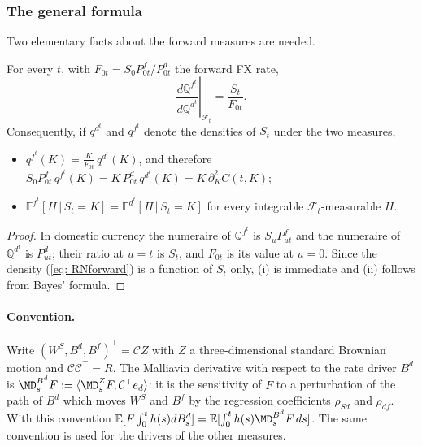 \subsubsection{The general formula}
Two elementary facts about the forward measures are needed.
\begin{lem}\label{lem: forwardMeasures}
For every $t$, with $F_{0t}=S_0P^f_{0t}/P^d_{0t}$ the forward FX rate,
\begin{equation}\label{eq: RNforward}
\left.\frac{d\mathbb{Q}^{f^t}}{d\mathbb{Q}^{d^t}}\right|_{\mathcal{F}_t}=\frac{S_t}{F_{0t}} .
\end{equation}
Consequently, if $q^{d^t}$ and $q^{f^t}$ denote the densities of $S_t$ under the two measures,
\begin{itemize}
\item[(i)] $q^{f^t}(K)=\frac{K}{F_{0t}}\,q^{d^t}(K)$, and therefore $S_0P^f_{0t}\,q^{f^t}(K)=K\,P^d_{0t}\,q^{d^t}(K)=K\,\partial_K^2C(t,K)$;
\item[(ii)] $\mathbb{E}^{f^t}[H\,|\,S_t=K]=\mathbb{E}^{d^t}[H\,|\,S_t=K]$ for every integrable $\mathcal{F}_t$-measurable $H$.
\end{itemize}
\end{lem}
\begin{proof}
In domestic currency the numeraire of $\mathbb{Q}^{f^t}$ is $S_uP^f_{ut}$ and the numeraire of $\mathbb{Q}^{d^t}$ is $P^d_{ut}$; their ratio at $u=t$ is $S_t$, and $F_{0t}$ is its value at $u=0$. Since the density (\ref{eq: RNforward}) is a function of $S_t$ only, (i) is immediate and (ii) follows from Bayes' formula.
\end{proof}

\paragraph{Convention.} Write $(W^S,B^d,B^f)^\top=\mathcal{C}Z$ with $Z$ a three-dimensional standard Brownian motion and $\mathcal{C}\mathcal{C}^\top=R$. The Malliavin derivative with respect to the rate driver $B^d$ is $\MD^{B^d}_sF:=\langle \MD^Z_sF,\mathcal{C}^\top e_d\rangle$: it is the sensitivity of $F$ to a perturbation of the path of $B^d$ which moves $W^S$ and $B^f$ by the regression coefficients $\rho_{Sd}$ and $\rho_{df}$. With this convention $\mathbb{E}[F\int_0^th(s)dB^d_s]=\mathbb{E}[\int_0^th(s)\MD^{B^d}_sF\,ds]$. The same convention is used for the drivers of the other measures.

